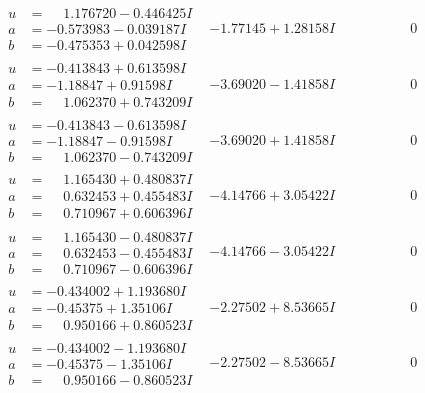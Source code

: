 \documentclass[1p]{elsarticle_modified}
\theoremstyle{definition}
\begin{document}
$$\begin{array}{c|c|c}
\begin{aligned}
u &= \phantom{-}1.176720 - 0.446425 I \\
a &= -0.573983 - 0.039187 I \\
b &= -0.475353 + 0.042598 I\end{aligned}
 & -1.77145 + 1.28158 I & \phantom{-0.000000 } 0 \\ \hline\begin{aligned}
u &= -0.413843 + 0.613598 I \\
a &= -1.18847 + 0.91598 I \\
b &= \phantom{-}1.062370 + 0.743209 I\end{aligned}
 & -3.69020 - 1.41858 I & \phantom{-0.000000 } 0 \\ \hline\begin{aligned}
u &= -0.413843 - 0.613598 I \\
a &= -1.18847 - 0.91598 I \\
b &= \phantom{-}1.062370 - 0.743209 I\end{aligned}
 & -3.69020 + 1.41858 I & \phantom{-0.000000 } 0 \\ \hline\begin{aligned}
u &= \phantom{-}1.165430 + 0.480837 I \\
a &= \phantom{-}0.632453 + 0.455483 I \\
b &= \phantom{-}0.710967 + 0.606396 I\end{aligned}
 & -4.14766 + 3.05422 I & \phantom{-0.000000 } 0 \\ \hline\begin{aligned}
u &= \phantom{-}1.165430 - 0.480837 I \\
a &= \phantom{-}0.632453 - 0.455483 I \\
b &= \phantom{-}0.710967 - 0.606396 I\end{aligned}
 & -4.14766 - 3.05422 I & \phantom{-0.000000 } 0 \\ \hline\begin{aligned}
u &= -0.434002 + 1.193680 I \\
a &= -0.45375 + 1.35106 I \\
b &= \phantom{-}0.950166 + 0.860523 I\end{aligned}
 & -2.27502 + 8.53665 I & \phantom{-0.000000 } 0 \\ \hline\begin{aligned}
u &= -0.434002 - 1.193680 I \\
a &= -0.45375 - 1.35106 I \\
b &= \phantom{-}0.950166 - 0.860523 I\end{aligned}
 & -2.27502 - 8.53665 I & \phantom{-0.000000 } 0 \\ \hline\begin{aligned}

\end{aligned}
\end{array}$$
\end{document}
